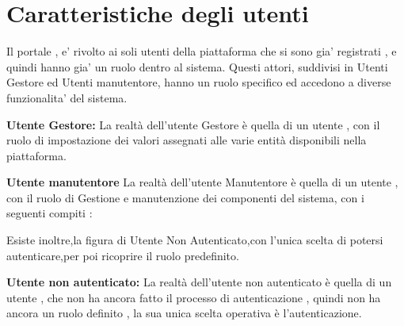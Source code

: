 \chapter{Caratteristiche degli utenti}

Il portale , e' rivolto ai soli utenti della piattaforma che si sono gia' registrati , e quindi hanno gia' un ruolo dentro al sistema.
Questi attori, suddivisi in Utenti Gestore ed Utenti manutentore, hanno un ruolo specifico ed accedono a diverse funzionalita' del sistema.

\textbf{Utente Gestore:} La realtà dell'utente Gestore è quella di un utente , con il ruolo di impostazione dei valori assegnati
alle varie entità disponibili nella piattaforma.

\textbf{Utente manutentore} La realtà dell'utente Manutentore è quella di un utente , con il ruolo di Gestione e manutenzione
dei componenti del sistema, con i seguenti compiti :

Esiste inoltre,la figura di Utente Non Autenticato,con l'unica scelta di potersi autenticare,per poi ricoprire il ruolo predefinito.

\textbf{Utente non autenticato:} La realtà dell'utente non autenticato è quella di un utente , che non ha ancora fatto il processo
di autenticazione , quindi non ha ancora un ruolo definito , la sua unica scelta operativa è l'autenticazione.
